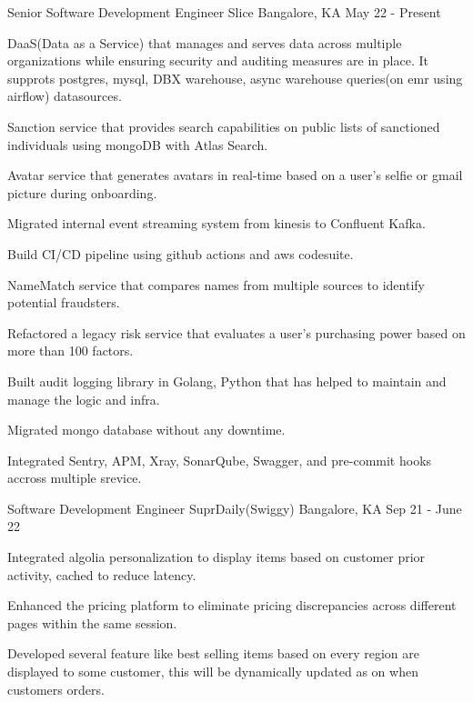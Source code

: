 \begin{cventries}
  \cventry
    {Senior Software Development Engineer}
    {Slice}
    {Bangalore, KA}
    {May 22 - Present}
    {
      \begin{cvitems}
        \item {DaaS(Data as a Service) that manages and serves data across multiple organizations while ensuring security and auditing measures are in place. It supprots postgres, mysql, DBX warehouse, async warehouse queries(on emr using airflow) datasources.}
        \item {Sanction service that provides search capabilities on public lists of sanctioned individuals using mongoDB with Atlas Search.}
        \item {Avatar service that generates avatars in real-time based on a user's selfie or gmail picture during onboarding.}
        \item {Migrated internal event streaming system from kinesis to Confluent Kafka.}
        \item {Build CI/CD pipeline using github actions and aws codesuite.}
        \item {NameMatch service that compares names from multiple sources to identify potential fraudsters.}
        \item {Refactored a legacy risk service that evaluates a user's purchasing power based on more than 100 factors.}
        \item {Built audit logging library in Golang, Python that has helped to maintain and manage the logic and infra.}
        \item {Migrated mongo database without any downtime.}
        \item {Integrated Sentry, APM, Xray, SonarQube, Swagger, and pre-commit hooks accross multiple srevice.}
      \end{cvitems}
    }
  
  \cventry
    {Software Development Engineer}
    {SuprDaily(Swiggy)}
    {Bangalore, KA}
    {Sep 21 - June 22}
    {
      \begin{cvitems}
        \item {Integrated algolia personalization to display items based on customer prior activity, cached to reduce latency.}
        \item {Enhanced the pricing platform to eliminate pricing discrepancies across different pages within the same session.}
        \item {Developed several feature like best selling items based on every region are displayed to some customer, this will be dynamically updated as on when customers orders.}
      \end{cvitems}
    }
  

\end{cventries}
